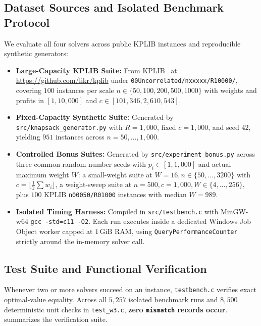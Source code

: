 \documentclass[10pt, a4paper]{article}
\newcommand{\code}[1]{\texttt{\color{primary!90!black}#1}}
\begin{document}
\subsection{Dataset Sources and Isolated Benchmark Protocol}
We evaluate all four solvers across public KPLIB instances and reproducible synthetic generators:
\begin{itemize}
  \item \textbf{Large-Capacity KPLIB Suite:} From KPLIB~\cite{kplib_repo} at \url{https://github.com/likr/kplib} under \code{00Uncorrelated/nxxxxx/R10000/}, covering $100$ instances per scale $n \in \{50, 100, 200, 500, 1000\}$ with weights and profits in $[1, 10{,}000]$ and $c \in [101{,}346, 2{,}610{,}543]$.
  \item \textbf{Fixed-Capacity Synthetic Suite:} Generated by \code{src/knapsack\_generator.py} with $R = 1{,}000$, fixed $c = 1{,}000$, and seed $42$, yielding $951$ instances across $n = 50, \ldots, 1{,}000$.
  \item \textbf{Controlled Bonus Suites:} Generated by \code{src/experiment\_bonus.py} across three common-random-number seeds with $p_i \in [1, 1{,}000]$ and actual maximum weight $W$: a small-weight suite at $W = 16, n \in \{50, \ldots, 3200\}$ with $c = \lfloor \frac{1}{2}\sum w_i \rfloor$, a weight-sweep suite at $n = 500, c = 1{,}000, W \in \{4, \ldots, 256\}$, plus $100$ KPLIB \code{n00050/R01000} instances with median $W = 989$.
  \item \textbf{Isolated Timing Harness:} Compiled in \code{src/testbench.c} with MinGW-w64 \texttt{gcc -std=c11 -O2}. Each run executes inside a dedicated Windows Job Object worker capped at $1\,\text{GiB}$ RAM, using \code{QueryPerformanceCounter} strictly around the in-memory solver call.
\end{itemize}

\subsection{Test Suite and Functional Verification}
Whenever two or more solvers succeed on an instance, \code{testbench.c} verifies exact optimal-value equality. Across all $5{,}257$ isolated benchmark runs and $8{,}500$ deterministic unit checks in \code{test\_w3.c}, \textbf{zero \code{mismatch} records occur}.  summarizes the verification suite.
\end{document}
